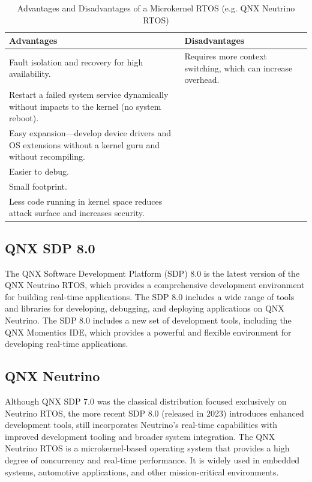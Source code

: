\documentclass{article}
\begin{document}
\begin{table}[!ht]
    \centering
    \small %
    \begin{tabularx}{\textwidth}{@{}Xl@{}}
        \toprule
        Advantages  & Disadvantages   \\ \midrule
        Fault isolation and recovery for high availability. & Requires more context switching, which can increase overhead. \\ \hline
        Restart a failed system service dynamically without impacts to the kernel (no system reboot). & \\ \hline
        Easy expansion—develop device drivers and OS extensions without a kernel guru and without recompiling. & \\ \hline
        Easier to debug. & \\ \hline
        Small footprint. & \\ \hline
        Less code running in kernel space reduces attack surface and increases security. & \\ \bottomrule
    \end{tabularx}
    \caption{Advantages and Disadvantages of a Microkernel RTOS (e.g. QNX Neutrino RTOS) \citep{WhatsRTOS2024}}
    \label{tab:microkernel-advantages}
\end{table}

\subsection{QNX SDP 8.0}
\label{sec:qnx-sdp}
The QNX Software Development Platform (SDP) 8.0 is the latest version of the QNX Neutrino RTOS, which provides a comprehensive development environment for building real-time applications.
The SDP 8.0 includes a wide range of tools and libraries for developing, debugging, and deploying applications on QNX Neutrino.
The SDP 8.0 includes a new set of development tools, including the QNX Momentics IDE, which provides a powerful and flexible environment for developing real-time applications.


\subsection{QNX Neutrino}
\label{sec:qnx-neutrino}
Although QNX SDP 7.0 was the classical distribution focused exclusively on Neutrino RTOS, the more recent SDP 8.0 (released in 2023) introduces enhanced development tools,
still incorporates Neutrino's real-time capabilities with improved development tooling and broader system integration.
The QNX Neutrino RTOS is a microkernel-based operating system that provides a high degree of concurrency and real-time performance.
It is widely used in embedded systems, automotive applications, and other mission-critical environments.
\end{document}
